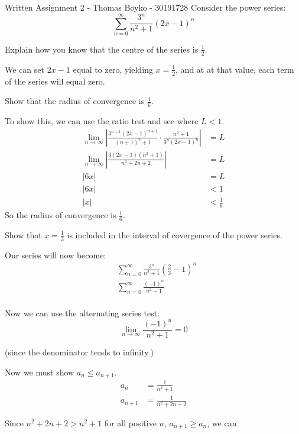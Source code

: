 \documentclass[]{article}
\begin{document}
\huge Written Assignment 2 - Thomas Boyko - 30191728 \nl \nl
\normalsize 
Consider the power series: 
\[\sum_{n=0}^{\infty}\frac{3^n}{n^2+1}(2x-1)^n\]

\begin{alphenum}
    \item Explain how you know that the centre of the series is $\frac{1}{2}$.
            \par We can set $2x-1$ equal to zero,
            yielding $x=\frac{1}{2}$, and at at that value,
            each term of the series will equal zero.
    \item Show that the radius of convergence is $\frac{1}{6}$.
            \par To show this, we can use the ratio test and see where $L<1$.
            \begin{align*}
            \lim_{n\to\infty}
            \left|\frac{3^{n+1} (2x-1)^{n+1}}{(n+1)^2+1}\cdot
            \frac{n^2+1}{3^n(2x-1)^n}
            \right| &= L\\
            \lim_{n\to\infty}\left|\frac{3(2x-1)(n^2+1)}{n^2+2n+2}\right| &= L \\
            |6x| &= L\\
            |6x| &<1 \\
            |x| &<\frac{1}{6}
            \end{align*}
            So the radius of convergence is $\frac{1}{6}$.
    \item Show that $x = \frac{1}{3}$ is included in the interval of covergence of the power series.
    \par Our series will now become: 
    \begin{align*}
    &\sum_{n=0}^{\infty}\frac{3^n}{n^2+1}(\frac{2}{3}-1)^n\\
    &\sum_{n=0}^{\infty}\frac{(-1)^n }{n^2+1}\\
    \end{align*}
    \par Now we can use the alternating series test.
        \[\lim_{n\to\infty}\frac{(-1)^n}{n^2+1}=0\]
    \par(since the denominator tends to infinity.)
    \par Now we must show $a_n\leq a_{n+1}$.
    \begin{align*}
        a_n &= \frac{1}{n^2+1}\\
        a_{n+1} &= \frac{1}{n^2+2n+2}
    \end{align*}
    \par Since $n^2+2n+2>n^2+1$ for all positive $n$, $a_{n+1}\geq a_n$, we can 

\end{alphenum}
\end{document}
